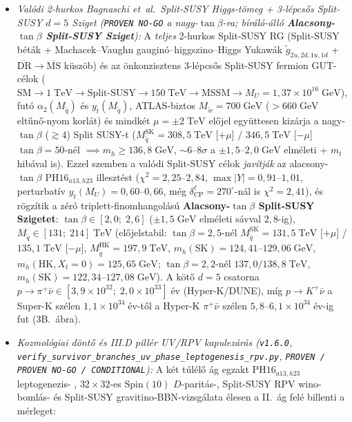 \documentclass[11pt,a4paper]{article}
\begin{document}
\begin{enumerate}
\begin{itemize}
        \item \emph{Valódi 2-hurkos Bagnaschi et~al.\ Split-SUSY Higgs-tömeg + 3-lépcsős Split-SUSY $d=5$ Sziget (\texttt{PROVEN NO-GO} a nagy-$\tan\beta$-ra; bíráló-álló \textbf{Alacsony-$\tan\beta$ Split-SUSY Sziget}):} A \emph{teljes} 2-hurkos Split-SUSY RG \cite{Bagnaschi2014} (Split-SUSY béták + Machacek--Vaughn gauginó--higgszino--Higgs Yukawák $\tilde g_{2u,2d,1u,1d}$ + $\overline{\mathrm{DR}}\to\overline{\mathrm{MS}}$ küszöb) és az önkonzisztens 3-lépcsős Split-SUSY fermion GUT-célok ($\mathrm{SM}\to 1\;\mathrm{TeV}\to\mathrm{Split\text{-}SUSY}\to 150\;\mathrm{TeV}\to\mathrm{MSSM}\to M_U=1{,}37\times 10^{16}\;\mathrm{GeV}$), futó $\alpha_2(M_{\tilde q})$ és $y_t(M_{\tilde q})$, ATLAS-biztos $M_{\tilde w}=700\;\mathrm{GeV}$ ($>660\;\mathrm{GeV}$ eltűnő-nyom korlát) és mindkét $\mu = \pm 2\;\mathrm{TeV}$ előjel együttesen kizárja a nagy-$\tan\beta$ ($\gtrsim 4$) Split SUSY-t ($M_{\tilde q}^{\mathrm{SK}}=308{,}5\;\mathrm{TeV}$ [$+\mu$] / $346{,}5\;\mathrm{TeV}$ [$-\mu$] $\tan\beta=50$-nél $\implies m_h\ge 136{,}8\;\mathrm{GeV}$, $\sim 6\text{--}8\sigma$ a $\pm 1{,}5\text{--}2{,}0\;\mathrm{GeV}$ elméleti + $m_t$ hibával is). Ezzel szemben a valódi Split-SUSY célok \emph{javítják} az alacsony-$\tan\beta$ $\mathrm{PH16}_{a13,h23}$ illesztést ($\chi^2=2{,}25\text{--}2{,}84$, $\max|Y|=0{,}91\text{--}1{,}01$, perturbatív $y_t(M_U)=0{,}60\text{--}0{,}66$, még $\delta_{\mathrm{CP}}^\ell=270^\circ$-nál is $\chi^2=2{,}41$), és rögzítik a zéró triplett-finomhangolású \textbf{Alacsony-$\tan\beta$ Split-SUSY Szigetet}: $\tan\beta\in[2{,}0;\; 2{,}6]$ ($\pm 1{,}5\;\mathrm{GeV}$ elméleti sávval $2{,}8$-ig), $M_{\tilde q}\in[131;\; 214]\;\mathrm{TeV}$ (előjelstabil: $\tan\beta=2{,}5$-nél $M_{\tilde q}^{\mathrm{SK}}=131{,}5\;\mathrm{TeV}$ [$+\mu$] / $135{,}1\;\mathrm{TeV}$ [$-\mu$], $M_{\tilde q}^{\mathrm{HK}}=197{,}9\;\mathrm{TeV}$, $m_h(\mathrm{SK})=124{,}41\text{--}129{,}06\;\mathrm{GeV}$, $m_h(\mathrm{HK}, X_t=0)=125{,}65\;\mathrm{GeV}$; $\tan\beta=2{,}2$-nél $137{,}0/138{,}8\;\mathrm{TeV}$, $m_h(\mathrm{SK})=122{,}34\text{--}127{,}08\;\mathrm{GeV}$). A kötő $d=5$ csatorna $p\to\pi^+\bar\nu\in[3{,}9\times 10^{32};\; 2{,}0\times 10^{33}]\;\text{év}$ (Hyper-K/DUNE), míg $p\to K^+\bar\nu$ a Super-K szélen $1{,}1\times 10^{34}\;\text{év}$-től a Hyper-K $\pi^+\bar\nu$ szélen $5{,}8\text{--}6{,}1\times 10^{34}\;\text{év}$-ig fut (3B.~ábra).
        \item \emph{Kozmológiai döntő és III.D pillér UV/RPV kapulezárás (\texttt{v1.6.0}, \texttt{verify\_\allowbreak survivor\_\allowbreak branches\_\allowbreak uv\_\allowbreak phase\_\allowbreak leptogenesis\_\allowbreak rpv.py}, \texttt{PROVEN / PROVEN NO-GO / CONDITIONAL}):} A két túlélő ág egzakt $\mathrm{PH16}_{a13,h23}$ leptogenezis- \cite{DiBari2005,Pilaftsis2004}, $32\times 32$-es $\mathrm{Spin}(10)$ $D$-paritás-, Split-SUSY RPV wino-bomlás- \cite{Barbier2005} és Split-SUSY gravitino-BBN-vizsgálata \cite{Kawasaki2018} élesen a II.~ág felé billenti a mérleget:

\end{itemize}
\end{enumerate}
\end{document}
